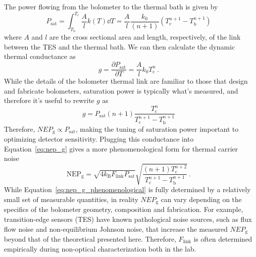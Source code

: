 The power flowing from the bolometer to the thermal bath is given by
\begin{equation}
    P_{\mathrm{sat}} = \int_{T_{\mathrm{b}}}^{T_{\mathrm{c}}} \frac{A}{l} k(T) \dd T = \frac{A}{l} \frac{k_{0}}{(n + 1)} \left( T_{\mathrm{c}}^{n + 1} - T_{\mathrm{b}}^{n + 1} \right)
    \label{eq:saturation_power_conductivity}
\end{equation}
where $A$ and $l$ are the cross sectional area and length, respectively, of the link between the TES and the thermal bath. We can then calculate the dynamic thermal conductance as
\begin{equation}
    g = \frac{\partial P_{\mathrm{sat}}}{\partial T} = \frac{A}{l} k_{0} T_{\mathrm{c}}^{n} \, .
    \label{eq:dynamic_conductance_a_over_l}
\end{equation}
While the details of the bolometer thermal link are familiar to those that design and fabricate bolometers, saturation power is typically what's measured, and therefore it's useful to rewrite $g$ as
\begin{equation}
    g = P_{\mathrm{sat}} (n + 1) \frac{T_{\mathrm{c}}^{n}}{T_{\mathrm{c}}^{n+1} - T_{\mathrm{b}}^{n+1}}
    \label{eq:g}
\end{equation}
Therefore, $NEP_{\mathrm{g}} \propto P_{\mathrm{sat}}$, making the tuning of saturation power important to optimizing detector sensitivity. Plugging this conductance into Equation~\ref{eq:nep_g} gives a more phenomenological form for thermal carrier noise
\begin{equation}
    \mathrm{NEP_{g}} = \sqrt{4 k_{\mathrm{B}} F_{\mathrm{link}} P_{\mathrm{sat}}} \sqrt{\frac{\left(n + 1 \right) T_{\mathrm{c}}^{n + 2}}{T_{c}^{n+1} - T_{\mathrm{b}}^{n + 1}}} \, .
    \label{eq:nep_g_phenomenological}
\end{equation}
While Equation~\ref{eq:nep_g_phenomenological} is fully determined by a relatively small set of measurable quantities, in reality $NEP_{\mathrm{g}}$ can vary depending on the specifics of the bolometer geometry, composition and fabrication. For example, transition-edge sensors (TES) have known pathological noise sources, such as flux flow noise and non-equilibrium Johnson noise, that increase the measured $NEP_{\mathrm{g}}$ beyond that of the theoretical presented here. Therefore, $F_{\mathrm{link}}$ is often determined empirically during non-optical characterization both in the lab.


